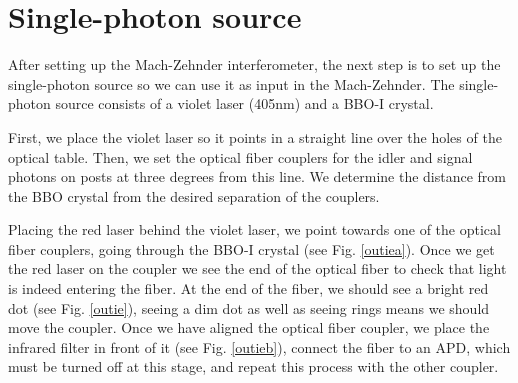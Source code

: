 \documentclass[12pt]{book}
\begin{document}
 





\section{Single-photon source}

After setting up the Mach-Zehnder interferometer, the next step is to set up the single-photon source so we can use it as input in the Mach-Zehnder. The single-photon source consists of a violet laser (405nm) and a BBO-I crystal.




First, we place the violet laser so it points in a straight line over the holes of the optical table. Then, we set the optical fiber couplers for the idler and signal photons on posts at three degrees from this line. We determine the distance from the BBO crystal from the desired separation of the couplers.

Placing the red laser behind the violet laser, we point towards one of the optical fiber couplers, going through the BBO-I crystal (see Fig. \ref{outiea}). Once we get the red laser on the coupler we see the end of the optical fiber to check that light is indeed entering the fiber. At the end of the fiber, we should see a bright red dot (see Fig. \ref{outie}), seeing a dim dot as well as seeing rings means we should move the coupler. Once we have aligned the optical fiber coupler, we place the infrared filter in front of it (see Fig. \ref{outieb}), connect the fiber to an APD, which must be turned off at this stage, and repeat this process with the other coupler.
\end{document}
